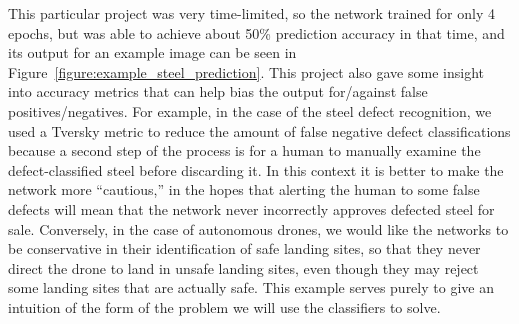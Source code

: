 This particular project was very time-limited, so the network trained for only 4 epochs,
but was able to achieve about 50\% prediction accuracy in that time,
and its output for an example image can be seen in Figure~\ref{figure:example_steel_prediction}.
This project also gave some insight into accuracy metrics that can help bias the output
for/against false positives/negatives.
For example, in the case of the steel defect recognition, we used a Tversky metric to
reduce the amount of false negative defect classifications because a second step of the
process is for a human to manually examine the defect-classified steel before discarding it.
In this context it is better to make the network more ``cautious,'' in the hopes that
alerting the human to some false defects will mean that the network never incorrectly approves
defected steel for sale.
Conversely, in the case of autonomous drones,
we would like the networks to be conservative in their identification of safe landing sites,
so that they never direct the drone to land in unsafe landing sites, even though they may reject
some landing sites that are actually safe.
This example serves purely to give an intuition of the form of the problem we will use the classifiers to solve.

